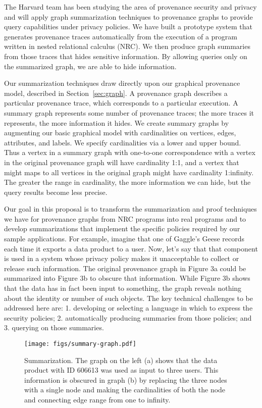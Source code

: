 \documentclass[10pt]{article}
\begin{document}
The Harvard team has been studying the area of provenance security and
privacy and will apply graph summarization techniques to provenance graphs
to provide query capabilities under privacy policies.
We have built a prototype system that generates provenance traces
automatically from the execution of a program written in nested
relational calculus (NRC).
We then produce graph summaries from those traces that hides sensitive
information.
By allowing queries only on the summarized graph, we are able to hide
information.

Our summarization techniques draw directly upon our graphical provenance
model, described in Section~\ref{sec:graph}.
A provenance graph describes a particular provenance trace, which corresponds
to a particular execution.
A summary graph represents some number of provenance traces; the more traces
it represents, the more information it hides.
We create summary graphs by augmenting our basic graphical model with
cardinalities on vertices, edges, attributes, and labels.
We specify cardinalities via a lower and upper bound.
Thus a vertex in a summary graph with one-to-one correspondence with a vertex
in the original provenance graph will have cardinality 1:1, and a vertex
that might maps to all vertices in the original graph might have cardinality
1:infinity.
The greater the range in cardinality, the more information we can hide, but
the query results become less precise.

Our goal in this proposal is to transform the summarization and proof 
techniques we have for provenance graphs from NRC programs into real
programs and to develop summarizations that implement the specific
policies required by our sample applications.
For example, imagine that one of Gaggle's Geese records
each time it exports a data product to a user.
Now, let's say that that component is used in a system whose privacy
policy makes it unacceptable to collect or release such information.
The original provenance graph in Figure 3a
could be summarized into Figure 3b
to obscure that information.
While Figure 3b shows that the data has in fact been input to something,
the graph reveals nothing about the identity or number of such objects.
The key technical challenges to be addressed here are: 1. developing or
selecting a language in which to express the security policies;
2. automatically producing summaries from those policies; and 3.
querying on those summaries.

\begin{wrapfigure}{R}{0.5\textwidth}
\vspace{-30pt}
\texttt{[image: figs/summary-graph.pdf]}
\vspace{-20pt}
\label{fig:full-graph}
\caption{\small{Summarization. The graph on the left (a) shows that the data product with ID 606613 was used as input to three users.
This information is obscured in graph (b) by replacing the three nodes with
a single node and making the cardinalities of both the node and connecting
edge range from one to infinity.}}
\end{wrapfigure}
\end{document}
